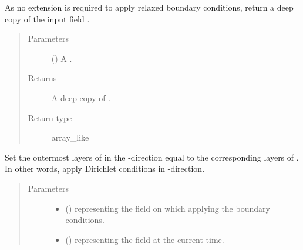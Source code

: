 \documentclass[letterpaper,10pt,english]{sphinxmanual}
\begin{document}
\begin{fulllineitems}
\begin{fulllineitems}
\label{\detokenize{api:dycore.horizontal_boundary.Relaxed.from_physical_to_computational_domain}}
As no extension is required to apply relaxed boundary conditions, return a deep copy of the
input field .
\begin{quote}\begin{description}
\item[{Parameters}] \leavevmode
{} () \textendash{} A .

\item[{Returns}] \leavevmode
A deep copy of .

\item[{Return type}] \leavevmode
array\_like

\end{description}\end{quote}

\end{fulllineitems}


\begin{fulllineitems}
\label{\detokenize{api:dycore.horizontal_boundary.Relaxed.set_outermost_layers_x}}
Set the outermost layers of  in the -direction equal to the corresponding
layers of . In other words, apply Dirichlet conditions in -direction.
\begin{quote}\begin{description}
\item[{Parameters}] \leavevmode\begin{itemize}
\item {} 
 () \textendash{}  representing the field on which applying the boundary conditions.

\item {} 
 () \textendash{}  representing the field at the current time.


\end{itemize}
\end{description}
\end{quote}
\end{fulllineitems}
\end{fulllineitems}
\end{document}
